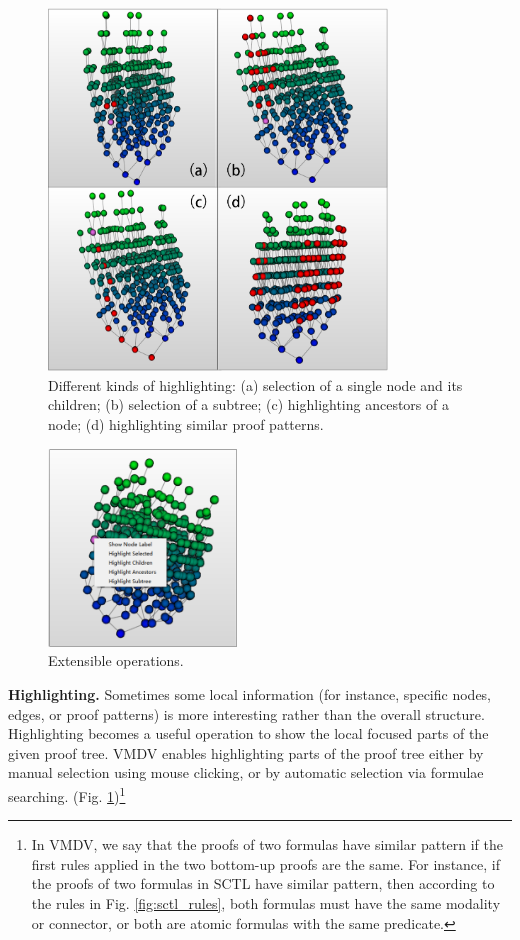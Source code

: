 \documentclass[runningheads]{llncs}
\newcommand\tool[1]{\textsf{#1}}
\newcommand\vmdv{\tool{VMDV}}
\begin{document}
 
\begin{figure}[h!]
\centering
\includegraphics[width=9cm]{./high_different.png}
\caption{Different kinds of highlighting: (a) selection of a single node and its children; (b) selection of a subtree; (c) highlighting ancestors of a node; (d) highlighting similar proof patterns.}
\label{fig:high_different}
\end{figure}
\begin{figure}[h!]
\centering
\includegraphics[width=5cm]{./user_defined_operation.png}
\caption{Extensible operations.}
\label{fig:user_defined_operation}
\end{figure}
\smallskip

\hspace{-0.48cm}
{\bf Highlighting.}
Sometimes some local information (for instance, specific nodes, edges, or proof patterns) is more interesting rather than the overall structure. Highlighting becomes a useful operation to show the local focused parts of the given proof tree. \vmdv{} enables highlighting parts of the proof tree either by manual selection using mouse clicking, or by automatic selection via formulae searching. (Fig. \ref{fig:high_different})\footnote{In \vmdv{}, we say that the proofs of two formulas have similar pattern if the first rules applied in the two bottom-up proofs are the same. For instance, if the proofs of two formulas in \textsf{SCTL} have similar pattern, then according to the rules in Fig. \ref{fig:sctl_rules}, both formulas must have the same modality or connector, or both are atomic formulas with the same predicate.}
\smallskip
\end{document}
